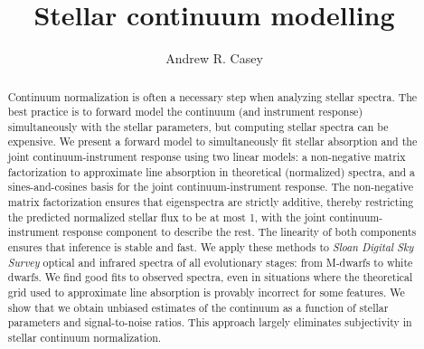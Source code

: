 \documentclass[modern]{aastex631}
\newcommand{\project}[1]{\textit{#1}}
\begin{document}
\title{\Huge Stellar continuum modelling}

\author[0000-0003-0174-0564]{Andrew R. Casey}



\begin{abstract}\noindent
Continuum normalization is often a necessary step when analyzing stellar spectra. The best practice is to forward model the continuum (and instrument response) simultaneously with the stellar parameters, but computing stellar spectra can be expensive.
We present a forward model to simultaneously fit stellar absorption and the joint continuum-instrument response using two linear models: a non-negative matrix factorization to approximate line absorption in theoretical (normalized) spectra, and a sines-and-cosines basis for the joint continuum-instrument response.
The non-negative matrix factorization ensures that eigenspectra are strictly additive, thereby restricting the predicted normalized stellar flux to be at most 1, with the joint continuum-instrument response component to describe the rest.
The linearity of both components ensures that inference is stable and fast.
We apply these methods to \project{Sloan Digital Sky Survey} optical and infrared spectra of all evolutionary stages: from M-dwarfs to white dwarfs.
We find good fits to observed spectra, even in situations where the theoretical grid used to approximate line absorption is provably incorrect for some features.
We show that we obtain unbiased estimates of the continuum as a function of stellar parameters and signal-to-noise ratios.
This approach largely eliminates subjectivity in stellar continuum normalization.
\end{abstract}


\section*{}\clearpage
\end{document}
